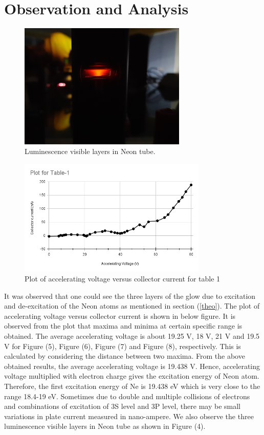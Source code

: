 \documentclass[a4paper, amsfonts, amssymb, amsmath, reprint, showkeys, nofootinbib, twoside]{revtex4-1}
\begin{document}
\section{Observation and Analysis}
\begin{figure}[H] %
   \centering
   \includegraphics[width=8cm]{i} 
   \caption{Luminescence visible layers in Neon tube.}
   \label{i}
\end{figure}

\begin{figure}[htbp] %
   \centering
   \includegraphics[width=9cm]{t1} 
   \caption{Plot of accelerating voltage versus collector current for table 1}
   \label{t1}
\end{figure}

It was observed that one could see the three layers of the glow due to excitation and de-excitation of the Neon atoms as mentioned in section (\ref{theo}). The plot of accelerating voltage versus collector current is shown in below figure. It is observed from the plot that maxima and minima at certain specific range is obtained. The average accelerating voltage is about 19.25 V, 18 V, 21 V and 19.5 V for Figure (5), Figure (6), Figure (7) and Figure (8), respectively. This is calculated by considering the distance between two maxima.  From the above obtained results, the average accelerating voltage is 19.438 V. Hence, accelerating voltage multiplied with electron charge gives the excitation energy of Neon atom. Therefore, the first excitation energy of Ne is 19.438 eV which is very close to the range 18.4-19 eV.  Sometimes due to double and multiple collisions of electrons and combinations of excitation of 3S level and 3P level, there may be small variations in plate current measured in nano-ampere. We also observe the three luminescence visible layers in Neon tube as shown in Figure (4).
\end{document}

